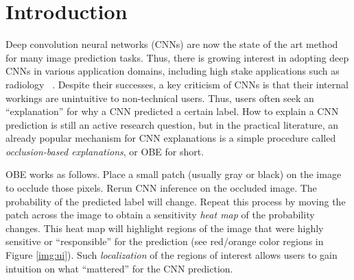 \documentclass{vldb}
\newcommand{\system}{\textsc{Krypton}}
\begin{document}
\begin{abstract}
In this demonstration we present \system, a system for accelerating occlusion based deep convolution neural network (CNN) explainability workloads.
Driven by the success of CNNs in image understanding tasks, there is growing adoption of CNN technology in various domains including high stake applications such as radiology.
However, users of such applications often seek an ``explanation'' for why a CNN predicted a certain label.
One of the widely used approaches for explaining the CNN predictions is the occlusion based explainability (OBE) method.
This approach is computationally expensive due to the large number of re-inference requests produced.
In this demo we present \system~, a system that reduces the runtime of OBE by up to 35x by enabling incremental and approximate inference optimizations.
We allow the audience to interactively diagnose CNN predictions from several use cases including radiology and natural images.
\end{abstract}




\section{Introduction}\label{introduction}

Deep convolution neural networks (CNNs) are now the state of the art method for many image prediction tasks. Thus, there is growing interest in adopting deep CNNs in various application domains, including high stake applications such as radiology ~\cite{kermany2018identifying}.
Despite their successes, a key criticism of CNNs is that their internal workings are unintuitive to non-technical users. Thus, users often seek an ``explanation'' for why a CNN predicted a certain label.
How to explain a CNN prediction is still an active research question, but in the practical literature, an already popular mechanism for CNN explanations is a simple procedure called \textit{occlusion-based explanations}, or OBE for short.

OBE works as follows. Place a small patch (usually gray or black) on the image to occlude those pixels. Rerun CNN inference on the occluded image. The probability of the predicted label will change. Repeat this process by moving the patch across the image to obtain a sensitivity \textit{heat map} of the probability changes. This heat map will highlight regions of the image that were highly sensitive or ``responsible'' for the prediction (see red/orange color regions in Figure \ref{img:ui}). Such \textit{localization} of the regions of interest allows users to gain intuition on what ``mattered'' for the CNN prediction.
\end{document}
